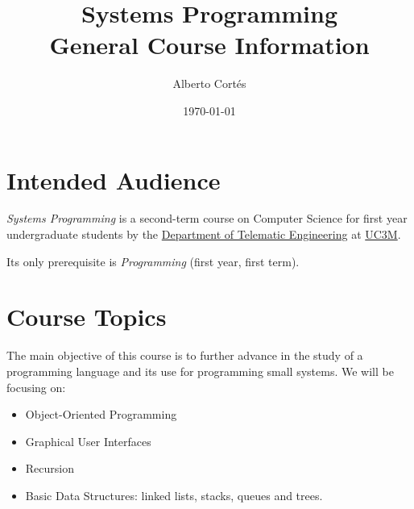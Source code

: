 \documentclass[11pt, a4paper, twoside]{article}
\begin{document}
\title{Systems Programming\\General Course Information}
\author{Alberto Cortés}
\date{\today}
\maketitle


\section{Intended Audience}

\emph{Systems Programming} is a second-term course on Computer Science for
first year undergraduate students by the \href{http://it.uc3m.es}{Department of
Telematic Engineering} at \href{http://uc3m.es}{UC3M}.


Its only prerequisite is \emph{Programming} (first year, first term).

\section{Course Topics}

The main objective of this course is to further advance in the study of a
programming language and its use for programming small systems. We will be
focusing on:

\begin{itemize}

  \item Object-Oriented Programming

  \item Graphical User Interfaces

  \item Recursion

  \item Basic Data Structures: linked lists, stacks, queues and trees.

\end{itemize}
\end{document}
